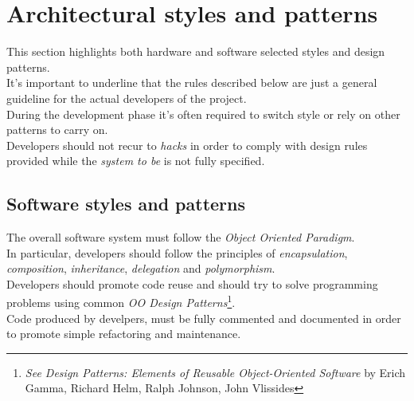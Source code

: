 \section{Architectural styles and patterns} %
\label{sec:architectural_styles_and_patterns_}
This section highlights both hardware and software selected styles and design patterns.\\
It's important to underline that the rules described below are just a general guideline for the actual developers of the project.\\
During the development phase it's often required to switch style or rely on other patterns to carry on.\\
Developers should not recur to \emph{hacks} in order to comply with design rules provided while the \emph{system to be} is not fully specified.
\subsection{Software styles and patterns} %
\label{sub:software_styles_and_patterns}
The overall software system must follow the \emph{Object Oriented Paradigm}.\\
In particular, developers should follow the principles of \emph{encapsulation}, \emph{composition}, \emph{inheritance}, \emph{delegation} and \emph{polymorphism}.\\
Developers should promote code reuse and should try to solve programming problems using common \emph{OO Design Patterns}\footnote{\emph{See Design Patterns:
Elements of Reusable Object-Oriented Software} by Erich Gamma,
Richard Helm,
Ralph Johnson,
John Vlissides}.\\
Code produced by develpers, must be fully commented and documented in order to promote simple refactoring and maintenance.
